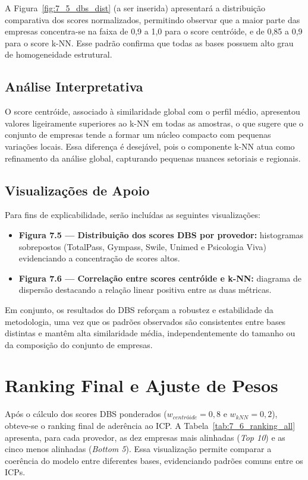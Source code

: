 A Figura~\ref{fig:7_5_dbs_dist} (a ser inserida) apresentará a distribuição comparativa dos scores normalizados, permitindo observar que a maior parte das empresas concentra-se na faixa de 0,9 a 1,0 para o score centróide, e de 0,85 a 0,9 para o score k-NN. Esse padrão confirma que todas as bases possuem alto grau de homogeneidade estrutural.

\subsection*{Análise Interpretativa}

O score centróide, associado à similaridade global com o perfil médio, apresentou valores ligeiramente superiores ao k-NN em todas as amostras, o que sugere que o conjunto de empresas tende a formar um núcleo compacto com pequenas variações locais. Essa diferença é desejável, pois o componente k-NN atua como refinamento da análise global, capturando pequenas nuances setoriais e regionais.

\subsection*{Visualizações de Apoio}

Para fins de explicabilidade, serão incluídas as seguintes visualizações:

\begin{itemize}
    \item \textbf{Figura 7.5 — Distribuição dos scores DBS por provedor:} histogramas sobrepostos (TotalPass, Gympass, Swile, Unimed e Psicologia Viva) evidenciando a concentração de scores altos.
    \item \textbf{Figura 7.6 — Correlação entre scores centróide e k-NN:} diagrama de dispersão destacando a relação linear positiva entre as duas métricas.
\end{itemize}

Em conjunto, os resultados do DBS reforçam a robustez e estabilidade da metodologia, uma vez que os padrões observados são consistentes entre bases distintas e mantêm alta similaridade média, independentemente do tamanho ou da composição do conjunto de empresas.

\section{Ranking Final e Ajuste de Pesos}

Após o cálculo dos scores DBS ponderados ($w_{centróide}=0{,}8$ e $w_{kNN}=0{,}2$), obteve-se o ranking final de aderência ao ICP. A Tabela~\ref{tab:7_6_ranking_all} apresenta, para cada provedor, as dez empresas mais alinhadas (\textit{Top 10}) e as cinco menos alinhadas (\textit{Bottom 5}). Essa visualização permite comparar a coerência do modelo entre diferentes bases, evidenciando padrões comuns entre os ICPs.


